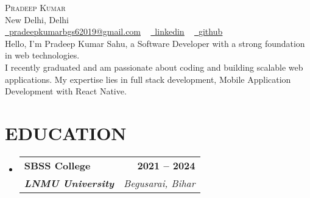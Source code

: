 \documentclass[letterpaper,11pt]{article}
\makeatletter
\newcommand{\resumeSubheading}[4]{
  \vspace{-2pt}\item
    \begin{tabular*}{1.0\textwidth}[t]{l@{\extracolsep{\fill}}r}
      \textbf{\large#1} & \textbf{\small #2} \\
      \textit{\large#3} & \textit{\small #4} \\
      
    \end{tabular*}\vspace{-7pt}
}
\newcommand{\resumeSubHeadingListStart}{\begin{itemize}[leftmargin=0.0in, label={}]}
\newcommand{\resumeSubHeadingListEnd}{\end{itemize}}
\makeatother
\begin{document}


\begin{center}
    {\Huge \scshape Pradeep Kumar} \\ \vspace{1pt}
    New Delhi, Delhi \\ \vspace{1pt}
    \small   \href{mailto:pradeepkumarbgs62019@gmail.com}{\raisebox{-0.2\height}\faEnvelope\  \underline{pradeepkumarbgs62019@gmail.com}} ~ 
    \href{https://www.linkedin.com/in/pradeep-sahu-180b3423a/}{\raisebox{-0.2\height}\faLinkedinSquare\ \underline{linkedin}}  ~
    \href{https://github.com/pradeepbgs}{\raisebox{-0.2\height}\faGithub\ \underline{github}} ~
    \vspace{-8pt} \\
    \vspace{18pt}
    Hello, I'm Pradeep Kumar Sahu, a Software Developer with a strong foundation in web technologies. \\ 
    I recently graduated and am passionate about coding and building scalable web applications. My expertise lies in full stack development, Mobile Application Development with React Native.
    \vspace{-8pt}
\end{center}



\section{EDUCATION}
  \resumeSubHeadingListStart
    \resumeSubheading
      {SBSS College}{ 2021 --  2024}
      { \textbf{LNMU University  } \textbf{}}{Begusarai, Bihar}
  \resumeSubHeadingListEnd
  

\end{document}
